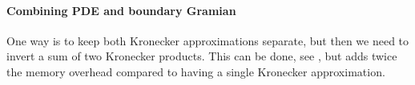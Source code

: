 
\paragraph{Combining PDE and boundary Gramian}
One way is to keep both Kronecker approximations separate, but then we need to invert a sum of two Kronecker products.
This can be done, see , but adds twice the memory overhead compared to having a single Kronecker approximation.



